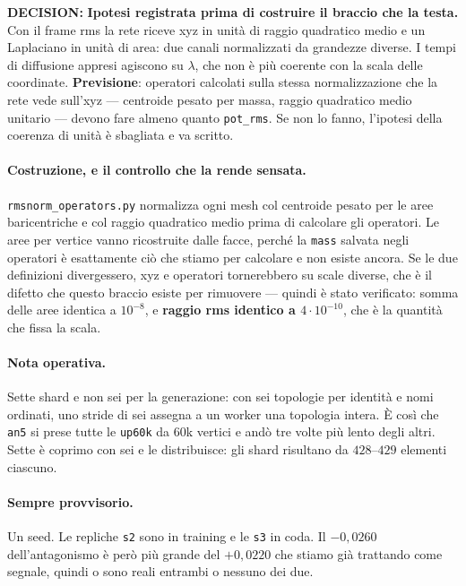 \documentclass[11pt,a4paper]{article}
\newcommand{\decision}[1]{\textcolor{decision}{\textbf{DECISION:}} #1}
\begin{document}
\decision{\textbf{Ipotesi registrata prima di costruire il braccio che la testa.} Con il frame
rms la rete riceve xyz in unit\`a di raggio quadratico medio e un Laplaciano in unit\`a di area:
due canali normalizzati da grandezze diverse. I tempi di diffusione appresi agiscono su
$\lambda$, che non \`e pi\`u coerente con la scala delle coordinate. \textbf{Previsione}: operatori
calcolati sulla stessa normalizzazione che la rete vede sull'xyz --- centroide pesato per massa,
raggio quadratico medio unitario --- devono fare almeno quanto \texttt{pot\_rms}. Se non lo
fanno, l'ipotesi della coerenza di unit\`a \`e sbagliata e va scritto.}

\paragraph{Costruzione, e il controllo che la rende sensata.} \texttt{rmsnorm\_operators.py}
normalizza ogni mesh col centroide pesato per le aree baricentriche e col raggio quadratico medio
prima di calcolare gli operatori. Le aree per vertice vanno ricostruite dalle facce, perch\'e la
\texttt{mass} salvata negli operatori \`e esattamente ci\`o che stiamo per calcolare e non esiste
ancora. Se le due definizioni divergessero, xyz e operatori tornerebbero su scale diverse, che \`e
il difetto che questo braccio esiste per rimuovere --- quindi \`e stato verificato: somma delle
aree identica a $10^{-8}$, e \textbf{raggio rms identico a $4\cdot10^{-10}$}, che \`e la quantit\`a
che fissa la scala.

\paragraph{Nota operativa.} Sette shard e non sei per la generazione: con sei topologie per
identit\`a e nomi ordinati, uno stride di sei assegna a un worker una topologia intera. \`E cos\`i
che \texttt{an5} si prese tutte le \texttt{up60k} da $60$k vertici e and\`o tre volte pi\`u lento
degli altri. Sette \`e coprimo con sei e le distribuisce: gli shard risultano da $428$--$429$
elementi ciascuno.

\paragraph{Sempre provvisorio.} Un seed. Le repliche \texttt{s2} sono in training e le
\texttt{s3} in coda. Il $-0{,}0260$ dell'antagonismo \`e per\`o pi\`u grande del $+0{,}0220$ che
stiamo gi\`a trattando come segnale, quindi o sono reali entrambi o nessuno dei due.
\end{document}
